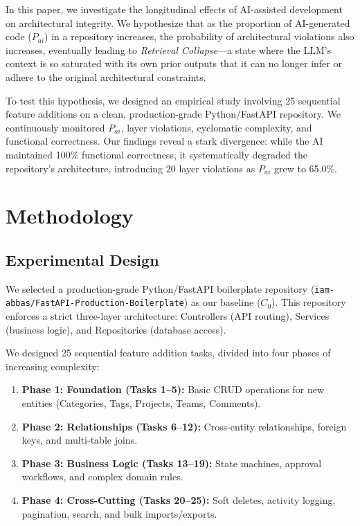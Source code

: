 \documentclass[11pt,a4paper]{article}
\begin{document}
In this paper, we investigate the longitudinal effects of AI-assisted development on architectural integrity. We hypothesize that as the proportion of AI-generated code ($P_{ai}$) in a repository increases, the probability of architectural violations also increases, eventually leading to \textit{Retrieval Collapse}—a state where the LLM's context is so saturated with its own prior outputs that it can no longer infer or adhere to the original architectural constraints.

To test this hypothesis, we designed an empirical study involving 25 sequential feature additions on a clean, production-grade Python/FastAPI repository. We continuously monitored $P_{ai}$, layer violations, cyclomatic complexity, and functional correctness. Our findings reveal a stark divergence: while the AI maintained 100\% functional correctness, it systematically degraded the repository's architecture, introducing 20 layer violations as $P_{ai}$ grew to 65.0\%.

\section{Methodology}

\subsection{Experimental Design}
We selected a production-grade Python/FastAPI boilerplate repository (\texttt{iam-abbas/FastAPI-Production-Boilerplate}) as our baseline ($C_0$). This repository enforces a strict three-layer architecture: Controllers (API routing), Services (business logic), and Repositories (database access). 

We designed 25 sequential feature addition tasks, divided into four phases of increasing complexity:
\begin{enumerate}
    \item \textbf{Phase 1: Foundation (Tasks 1--5):} Basic CRUD operations for new entities (Categories, Tags, Projects, Teams, Comments).
    \item \textbf{Phase 2: Relationships (Tasks 6--12):} Cross-entity relationships, foreign keys, and multi-table joins.
    \item \textbf{Phase 3: Business Logic (Tasks 13--19):} State machines, approval workflows, and complex domain rules.
    \item \textbf{Phase 4: Cross-Cutting (Tasks 20--25):} Soft deletes, activity logging, pagination, search, and bulk imports/exports.
\end{enumerate}
\end{document}
